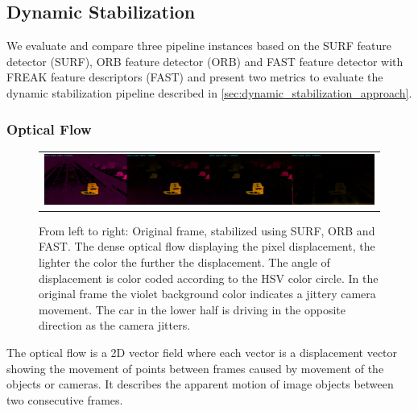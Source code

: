 \subsection{Dynamic Stabilization}
\label{sec:evaluation_dynamic_stabilization}
We evaluate and compare three pipeline instances based on the SURF \cite{bay10.1007/11744023_32,opencv_library} feature detector (SURF), 
ORB \cite{rublee6126544, opencv_library} feature detector (ORB) and FAST \cite{Ghahremani_2021,opencv_library} feature detector with FREAK \cite{alahi6247715,opencv_library} feature descriptors (FAST) 
and present two metrics to evaluate the dynamic stabilization pipeline described in \autoref{sec:dynamic_stabilization_approach}.


\subsubsection{Optical Flow}
\begin{figure}[!ht]
    \centering
    \begin{tabular}{c}
      \includegraphics[width=0.95\linewidth]{images/frame_1317_cropped.png}    
    \end{tabular}
    \caption{
        From left to right: Original frame, stabilized using SURF, ORB and FAST.
        The dense optical flow displaying the pixel displacement, the lighter the color the further the displacement. 
        The angle of displacement is color coded according to the HSV color circle.  
        In the original frame the violet background color indicates a jittery camera movement. 
        The car in the lower half is driving in the opposite direction as the camera jitters. 
    }
    \label{fig:optical_flow_example}
\end{figure}

The optical flow is a 2D vector field where each vector is a displacement vector showing the movement of points between frames caused by movement of the objects or cameras.
It describes the apparent motion of image objects between two consecutive frames. 

